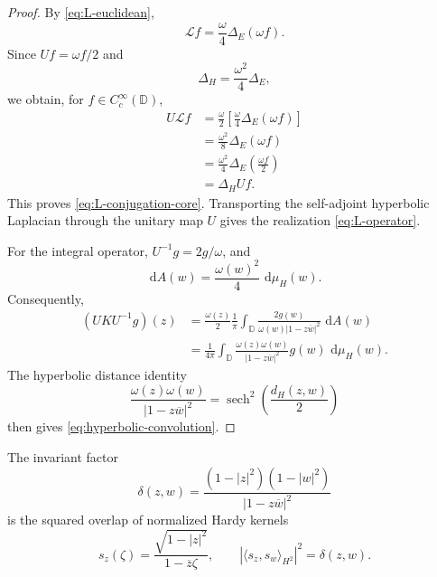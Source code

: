 \IfFileExists{iopjournal.cls}{\documentclass{iopjournal}}{\documentclass{iopjournal-draft}}
\theoremstyle{definition}
\theoremstyle{remark}
\newcommand{\D}{\mathbb D}
\newcommand{\dd}{\,\mathrm d}
\newcommand{\sech}{\operatorname{sech}}
\newcommand{\ip}[2]{\langle #1,#2\rangle}
\numberwithin{equation}{section}
\begin{document}
\begin{proof}
	By \eqref{eq:L-euclidean},
	\[
	\mathcal Lf
	=
	\frac{\omega}{4}\Delta_E(\omega f).
	\]
	Since $Uf=\omega f/2$ and
	\[
	\Delta_H=\frac{\omega^2}{4}\Delta_E,
	\]
	we obtain, for $f\in C_c^\infty(\D)$,
	\[
	\begin{aligned}
		U\mathcal Lf
		&=
		\frac{\omega}{2}
		\left[
		\frac{\omega}{4}\Delta_E(\omega f)
		\right] \\
		&=
		\frac{\omega^2}{8}\Delta_E(\omega f)\\
		&=
		\frac{\omega^2}{4}
		\Delta_E\left(\frac{\omega f}{2}\right)\\
		&=
		\Delta_HUf.
	\end{aligned}
	\]
	This proves \eqref{eq:L-conjugation-core}.  Transporting the
	self-adjoint hyperbolic Laplacian through the unitary map $U$ gives
	the realization \eqref{eq:L-operator}.
	
	For the integral operator, $U^{-1}g=2g/\omega$, and
	\[
	\dd A(w)=\frac{\omega(w)^2}{4}\,\dd\mu_H(w).
	\]
	Consequently,
	\[
	\begin{aligned}
		(UKU^{-1}g)(z)
		&=
		\frac{\omega(z)}2
		\frac1\pi
		\int_{\D}
		\frac{2g(w)}
		{\omega(w)|1-z\overline w|^2}\,\dd A(w)\\
		&=
		\frac1{4\pi}
		\int_{\D}
		\frac{\omega(z)\omega(w)}
		{|1-z\overline w|^2}
		g(w)\,\dd\mu_H(w).
	\end{aligned}
	\]
	The hyperbolic distance identity
	\[
	\frac{\omega(z)\omega(w)}
	{|1-z\overline w|^2}
	=
	\sech^2\!\left(\frac{d_H(z,w)}2\right)
	\]
	then gives \eqref{eq:hyperbolic-convolution}.
\end{proof}

The invariant factor
\begin{equation}
 \delta(z,w)=\frac{(1-|z|^2)(1-|w|^2)}{|1-z\overline w|^2}
 \label{eq:hardy-overlap}
\end{equation}
is the squared overlap of normalized Hardy kernels
\[
 s_z(\zeta)=\frac{\sqrt{1-|z|^2}}{1-\overline z\zeta},
 \qquad
 |\ip{s_z}{s_w}_{H^2}|^2=\delta(z,w).
\]
\end{document}
